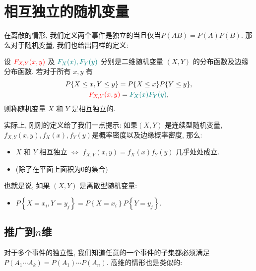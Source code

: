 \section{相互独立的随机变量}

在离散的情形, 我们定义两个事件是独立的当且仅当$P(AB)=P(A)P(B)$. 那么对于随机变量, 我们也给出同样的定义: 

\begin{definition}[相互独立的随机变量]
    设 ${{\color{red}F_{X,Y}(x, y)}}$ 及 ${{\color{teal}F_X(x), F_Y(y)}}$ 分别是二维随机变量 $(X, Y)$ 的分布函数及边缘分布函数. 若对于所有 $x, y$ 有
    $$
\begin{gathered}
    P\{X \leq x, Y \leq y\}=P\{X \leq x\} P\{Y \leq y\}, \\
{{\color{red}F_{X,Y}(x, y)}}={{\color{teal}F_X(x) F_Y(y)}},
\end{gathered}
$$
则称随机变量 $X$ 和 $Y$ 是相互独立的.
\end{definition}

实际上, 刚刚的定义给了我们一点提示: 如果$(X, Y)$ 是连续型随机变量,$f_{X,Y}(x, y), f_X(x), f_Y(y)$是概率密度以及边缘概率密度, 那么: 
\begin{itemize}
    \item $X$ 和 $Y$ 相互独立 $\iff$ $f_{X,Y}(x, y)=f_X(x) f_Y(y)$ 几乎处处成立. 
    \item (除了在平面上面积为0的集合)
\end{itemize}

也就是说, 如果 $(X, Y)$ 是离散型随机变量:
    \begin{itemize}
        \item $P\left\{X=x_i, Y=y_j\right\}=P\left\{X=x_i\right\} P\left\{Y=y_j\right\}$.
    \end{itemize}

\subsection{推广到$n$维}

对于多个事件的独立性, 我们知道任意的一个事件的子集都必须满足$P(A_1\cdots A_k)=P(A_1)\cdots P(A_n)$. 高维的情形也是类似的: 

